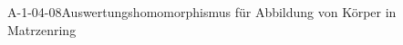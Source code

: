 
\begin{EXA}{A-1-04-08}{Auswertungshomomorphismus für Abbildung von Körper in Matrzenring}
\end{EXA}
